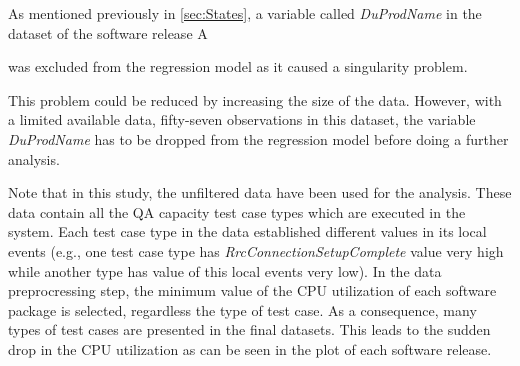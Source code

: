 As mentioned previously in \ref{sec:States}, a variable called \emph{DuProdName}
in the dataset of the software release A%
\begin{comment}
, which is an exact linear combination of the other variables,
\end{comment}
{} was excluded from the regression model as it caused a singularity
problem. %
\begin{comment}
The singularity often happens when the size of data is small. 
\end{comment}
This problem could be reduced by increasing the size of the data.
However, with a limited available data, fifty-seven observations in
this dataset, the variable \emph{DuProdName} has to be dropped from
the regression model before doing a further analysis. %
\begin{comment}
Fifty-seven observations in this dataset were used to train the Markov
switching model. The dataset (or the number of test cases in the software
release) is rather small, which increases a probability of singularity
occurrence. Therefore, unless there is more data, it is better to
drop the variable from the regression model before doing a further
analysis.
\end{comment}

Note that in this study, the unfiltered data have been used for the
analysis. These data contain all the QA capacity test case types which
are executed in the system. Each test case type in the data established
different values in its local events (e.g., one test case type has
\emph{RrcConnectionSetupComplete} value very high while another type
has value of this local events very low). In the data preprocressing
step, the minimum value of the CPU utilization of each software package
is selected, regardless the type of test case. As a consequence, many
types of test cases are presented in the final datasets. This leads
to the sudden drop in the CPU utilization as can be seen in the plot
of each software release.

